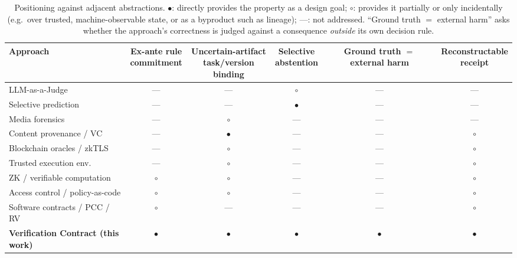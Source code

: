 \documentclass[sigconf,anonymous,review]{acmart}
\begin{document}
\begin{table}[t]
\centering
\footnotesize
\caption{Positioning against adjacent abstractions. $\bullet$: directly provides the property as a design goal; $\circ$: provides it partially or only incidentally (e.g.\ over trusted, machine-observable state, or as a byproduct such as lineage); ---: not addressed. ``Ground truth $=$ external harm'' asks whether the approach's correctness is judged against a consequence \emph{outside} its own decision rule.}
\label{tab:positioning}
\begin{tabular}{@{}lccccc@{}}
\toprule
Approach & \shortstack{Ex-ante rule\\commitment} & \shortstack{Uncertain-artifact\\task/version binding} & \shortstack{Selective\\abstention} & \shortstack{Ground truth $=$\\external harm} & \shortstack{Reconstructable\\receipt} \\
\midrule
LLM-as-a-Judge \cite{zheng2023judging,liu2023geval} & --- & --- & $\circ$ & --- & --- \\
Selective prediction \cite{geifman2017selective,hendrickx2024reject} & --- & --- & $\bullet$ & --- & --- \\
Media forensics \cite{verdoliva2020media} & --- & $\circ$ & --- & --- & --- \\
Content provenance / VC \cite{c2pa2023spec,sporny2022vc} & --- & $\bullet$ & --- & --- & $\circ$ \\
Blockchain oracles / zkTLS \cite{zhang2016towncrier,zhang2020deco} & --- & $\circ$ & --- & --- & $\circ$ \\
Trusted execution env.\ \cite{costan2016sgx,intel2021tdx} & --- & $\circ$ & --- & --- & $\circ$ \\
ZK / verifiable computation \cite{parno2013pinocchio,ben2014succinct} & $\circ$ & $\circ$ & --- & --- & $\circ$ \\
Access control / policy-as-code \cite{saltzer1975protection,opa2023} & $\circ$ & $\circ$ & --- & --- & $\circ$ \\
Software contracts / PCC / RV \cite{meyer1997object,necula1997proof,leucker2009brief} & $\circ$ & --- & --- & --- & $\circ$ \\
\midrule
\textbf{Verification Contract (this work)} & $\bullet$ & $\bullet$ & $\bullet$ & $\bullet$ & $\bullet$ \\
\bottomrule
\end{tabular}
\end{table}
\end{document}
